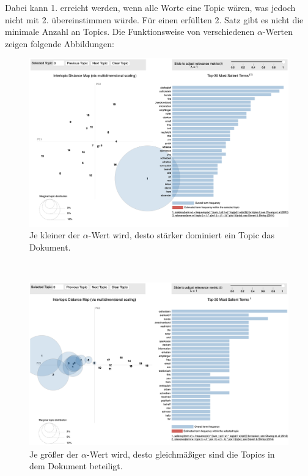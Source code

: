 \documentclass[german,version-2020-11]{uzl-thesis}
\begin{document}
Dabei kann 1. erreicht werden, wenn alle Worte eine Topic wären, was jedoch nicht mit 2. übereinstimmen würde. Für einen erfüllten 2. Satz gibt es nicht die minimale Anzahl an Topics. Die Funktionsweise von verschiedenen $\alpha$-Werten zeigen folgende Abbildungen: 
\\
\begin{figure}[h]
\begin{center}
\includegraphics[scale=0.315]{lda_alpha001.png}
\end{center}
\caption{Je kleiner der $\alpha$-Wert wird, desto stärker dominiert ein Topic das Dokument.} 
\label{fig:img1}
\end{figure}\\
\begin{figure}[h]
\begin{center}
\includegraphics[scale=0.315]{lda_alpha1.png}
\caption{Je größer der $\alpha$-Wert wird, desto gleichmäßiger sind die Topics in dem Dokument beteiligt.}
\label{fig:img2}
\end{center}
\end{figure}\\
\end{document}
